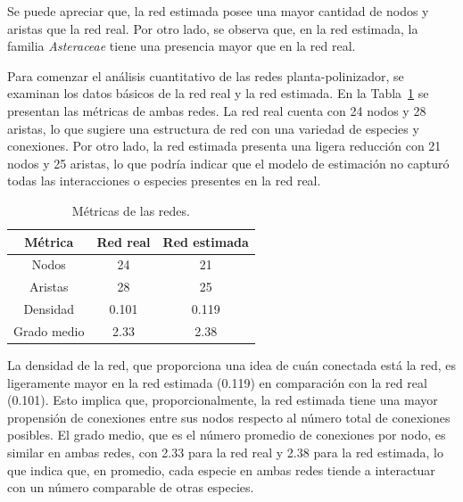 Se puede apreciar que, la red estimada posee una mayor cantidad de nodos y aristas que la red real. Por otro lado, se observa que, en la red estimada, la familia \textit{Asteraceae} tiene una presencia mayor que en la red real.

Para comenzar el análisis cuantitativo de las redes planta-polinizador, se examinan los datos básicos de la red real y la red estimada. En la Tabla~\ref{tab:metricas_redes} se presentan las métricas de ambas redes. La red real cuenta con 24 nodos y 28 aristas, lo que sugiere una estructura de red con una variedad de especies y conexiones. Por otro lado, la red estimada presenta una ligera reducción con 21 nodos y 25 aristas, lo que podría indicar que el modelo de estimación no capturó todas las interacciones o especies presentes en la red real.

\begin{table}[H]
    \centering\small
    \begin{tabular}{ccc}
    \toprule
          \textbf{Métrica} & \textbf{Red real}  &  \textbf{Red estimada}\\ 
    \midrule
        Nodos &  24 &  21 \\
        Aristas &  28 &  25 \\
        Densidad &  0.101 &  0.119 \\
        Grado medio & 2.33 & 2.38 \\
    \bottomrule
    \end{tabular}
    \caption{Métricas de las redes.}
    \label{tab:metricas_redes}
\end{table}

La densidad de la red, que proporciona una idea de cuán conectada está la red, es ligeramente mayor en la red estimada (0.119) en comparación con la red real (0.101). Esto implica que, proporcionalmente, la red estimada tiene una mayor propensión de conexiones entre sus nodos respecto al número total de conexiones posibles. El grado medio, que es el número promedio de conexiones por nodo, es similar en ambas redes, con 2.33 para la red real y 2.38 para la red estimada, lo que indica que, en promedio, cada especie en ambas redes tiende a interactuar con un número comparable de otras especies.

